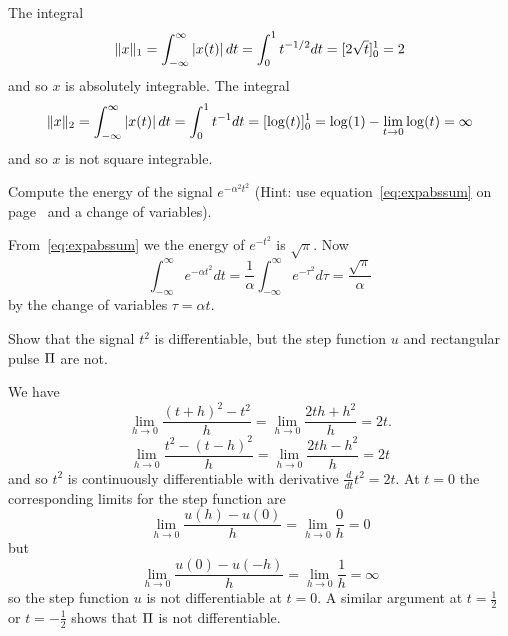 \begin{excersizelist}
\begin{solution}
\begin{center}
\end{center}
The integral
\[
\|x\|_1 = \int_{-\infty}^\infty \left\vert x(t) \right\vert dt = \int_{0}^1 t^{-1/2} dt = [2\sqrt{t}]_0^1 = 2
\]
and so $x$ is absolutely integrable.  The integral
\[
\|x\|_2 = \int_{-\infty}^\infty \left\vert x(t) \right\vert dt = \int_{0}^1 t^{-1} dt = [\log(t)]_0^1 = \log(1) - \lim_{t \to 0}\log(t) = \infty
\]
and so $x$ is not square integrable.
\end{solution}

\item \label{excer:energyexpchangevar} Compute the energy of the signal $e^{-\alpha^2 t^2}$ (Hint: use equation~\eqref{eq:expabssum} on page~\pageref{eq:expabssum} and a change of variables).
\begin{solution}
From~\eqref{eq:expabssum} we the energy of $e^{-t^2}$ is $\sqrt{\pi}$.  Now
\[
\int_{-\infty}^\infty e^{-\alpha t^2} dt = \frac{1}{\alpha}\int_{-\infty}^\infty e^{-\tau^2} d\tau = \frac{\sqrt{\pi}}{\alpha}
\]
by the change of variables $\tau = \alpha t$.
\end{solution}

\item \label{exer:steprectnotdiff}Show that the signal $t^2$ is differentiable, but the step function $u$ and rectangular pulse $\Pi$ are not.
\begin{solution}
We have
\[
\lim_{h \to 0} \frac{(t + h)^2 - t^2}{h} = \lim_{h \to 0} \frac{2 t h + h^2}{h} = 2t.
\]
\[
\lim_{h \to 0} \frac{t^2 - (t-h)^2}{h} = \lim_{h \to 0} \frac{2 t h - h^2}{h} = 2t
\]
and so $t^2$ is continuously differentiable with derivative $\frac{d}{dt} t^2 = 2t$.  At $t = 0$ the corresponding limits for the step function are
\[
\lim_{h \to 0} \frac{u(h) - u(0)}{h} = \lim_{h \to 0} \frac{0}{h} = 0
\]
but
\[
\lim_{h \to 0} \frac{u(0) - u(-h)}{h} = \lim_{h \to 0} \frac{1}{h} = \infty
\]
so the step function $u$ is not differentiable at $t = 0$.  A similar argument at $t=\tfrac{1}{2}$ or $t = -\tfrac{1}{2}$ shows that $\Pi$ is not differentiable.
\end{solution}


\end{excersizelist}
